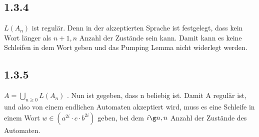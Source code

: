 \documentclass{article}
\begin{document}
\subsection{1.3.4}

$L(A_n)$ ist regulär. Denn in der akzeptierten Sprache ist festgelegt, dass kein Wort länger als $n + 1, n$ Anzahl der Zustände sein kann. Damit kann es keine Schleifen in dem Wort geben und das Pumping Lemma nicht widerlegt werden.

 \subsection{1.3.5}
 
 $A = \bigcup_{n \geq 0} L(A_n)$ . Nun ist gegeben, dass n beliebig ist. Damit A regulär ist, und also von einem endlichen Automaten akzeptiert wird, muss es eine Schleife in einem Wort $w \in (a^{2i}\cdot c\cdot b^{2i})$ geben, bei dem $i \g n, n$ Anzahl der Zustände des Automaten. 
 
\end{document}
